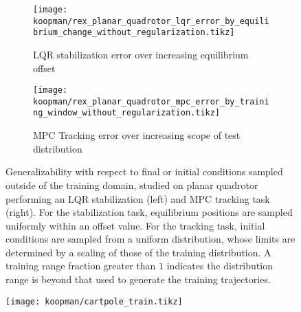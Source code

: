 \documentclass[../root.tex]{subfiles}
\begin{document}
\begin{figure}
  \begin{subfigure}{0.49\textwidth}
    \centering
    \texttt{[image: koopman/rex\_planar\_quadrotor\_lqr\_error\_by\_equilibrium\_change\_without\_regularization.tikz]}
    \caption{LQR stabilization error over increasing equilibrium offset 
    }
    \label{fig:rex_planar_quadrotor_lqr_error_by_equilibrium_change}
  \end{subfigure}
  \hfill
  \begin{subfigure}{0.48\textwidth}
    \raggedright
    \texttt{[image: koopman/rex\_planar\_quadrotor\_mpc\_error\_by\_training\_window\_without\_regularization.tikz]}
    \caption{MPC Tracking error over increasing scope of test distribution 
    }
    \label{fig:rex_planar_quadrotor_mpc_error_by_training_window}
  \end{subfigure}
  \caption{Generalizability with respect to final or initial conditions sampled outside of the training domain, studied on planar quadrotor performing an LQR stabilization (left) and MPC tracking task (right). For the stabilization task,  equilibrium positions are sampled uniformly within an offset value. For the tracking task,  initial conditions are sampled from a uniform distribution, whose limits are determined by a scaling of those of the training distribution. A training range fraction greater than $1$
   indicates the distribution range is beyond that used to generate 
  the training trajectories.
  }
\end{figure}

\begin{figure}
    \centering
    \texttt{[image: koopman/cartpole\_train.tikz]}
    \caption{}
    \label{fig:cartpole_train}
    \hfill
\end{figure}
\end{document}
